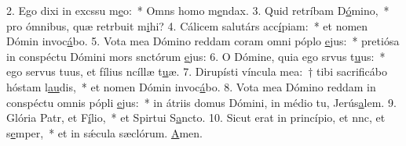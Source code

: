 2. Ego dixi in excssu m\uline{e}o:~* Omns homo m\uline{e}ndax.
3. Quid retríbam D\uline{ó}mino,~* pro ómnibus, quæ retrbuit m\uline{i}hi?
4. Cálicem salutárs acc\uline{í}piam:~* et nomen Dómin invoc\uline{á}bo.
5. Vota mea Dómino reddam coram omni póplo \uline{e}jus:~* pretiósa in conspéctu Dómini mors snctórum \uline{e}jus:
6. O Dómine, quia ego srvus t\uline{u}us:~* ego servus tuus, et fílius ncíllæ t\uline{u}æ.
7. Dirupísti víncula mea:~† tibi sacrificábo hóstam l\uline{au}dis,~* et nomen Dómin invoc\uline{á}bo.
8. Vota mea Dómino reddam in conspéctu omnis pópli \uline{e}jus:~* in átriis domus Dómini, in médio tu, Jerús\uline{a}lem.
9. Glória Patr, et F\uline{í}lio,~* et Spirtui S\uline{a}ncto.
10. Sicut erat in princípio, et nnc, et s\uline{e}mper,~* et in sǽcula sæclórum. \uline{A}men.
